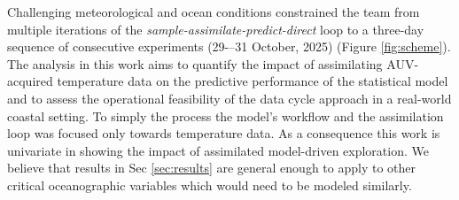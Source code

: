 





Challenging meteorological and ocean conditions constrained the team
from multiple iterations of the
\emph{sample-assimilate-predict-direct} loop to
a three-day sequence of consecutive experiments (29-–31 October,
2025) (Figure \ref{fig:scheme}). The analysis in this work aims to quantify the impact of
assimilating AUV-acquired temperature data on the predictive
performance of the statistical model and to assess the operational
feasibility of the data cycle approach in a real-world coastal
setting. To simply the process the model's workflow and the
assimilation loop was focused only towards temperature data. As a
consequence this work is univariate in showing the impact of
assimilated model-driven exploration. We believe that results in Sec
\ref{sec:results} are general enough to apply to other critical
oceanographic variables which would need to be modeled similarly.


